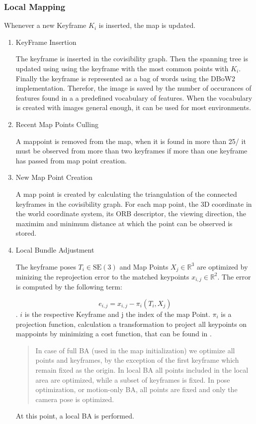 	
	\subsubsection{Local Mapping}
	
	Whenever a new Keyframe $K_i$ is inserted, the map is updated. 
	
	
	\begin{enumerate}
	\item{KeyFrame Insertion}
	
	The keyframe is inserted in the covisibility graph. Then the spanning tree
	is updated using using the keyframe with the most common points with $K_i$.
	Finally the keyframe is represented as a bag of words using the DBoW2 implementation. 
	Therefor, the image is saved by the number of occurances of features found in a a predefined
	vocabulary of features. When the vocabulary is created with images general enough, 
	it can be used for most environments.
	

	
	\item{Recent Map Points Culling}
	
	A mappoint is removed from the map, when it is found in more than 
	25/%
	it must be observed from more than two keyframes if more than one keyframe 
	has passed from map point creation. 
	
	\item{New Map Point Creation}
	
	A map point is created by calculating the triangulation of the connected
	keyframes in the covisibility graph. For each map point, the 3D coordinate 
	in the world coordinate system, its ORB descriptor, the viewing direction, 
	the maximim and minimum distance at which the point can be observed is stored. 
	
	\item{Local Bundle Adjustment}
	
	The keyframe poses $T_i \in \text{SE}(3)$ and Map Points $X_j \in \mathbb{R}^{3}$ 
	are optimized by minizing the reprojection error to the matched keypoints $x_{i,j} \in \mathbb{R}^{2}$.
	The error is computed by the following term:
	
	$$ e_{i,j} = x_{i,j} - \pi_i\left(T_i, X_j\right) $$. 
	$i$ is the respective Keyframe and j the index of the map Point. 
	$\pi_i$ is a projection function, calculation a transformation 
	to project all keypoints on mappoints by minimizing a cost function, that
	can be found in \cite{ba}.
	\begin{quote}
	In case of full BA
	(used in the map initialization) we optimize
	all points and keyframes, by the exception of the first
	keyframe which remain fixed as the origin. In local BA
	all points included in the local area
	are optimized, while a subset of keyframes is fixed. In
	pose optimization, or motion-only BA, all
	points are fixed and only the camera pose is optimized.
	\end{quote}
	At this point, a local BA is performed.
	

\end{enumerate}
